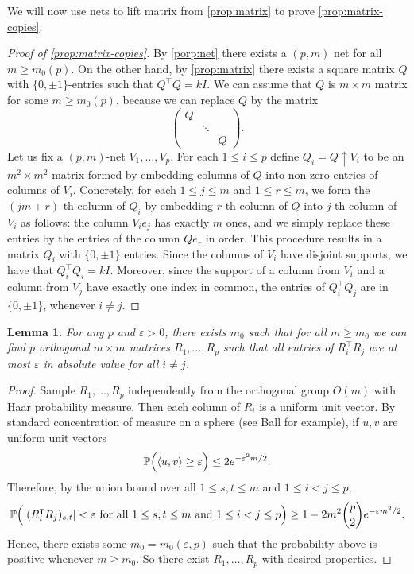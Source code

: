 \documentclass[reqno, 11pt]{amsart}
\newtheorem{lemma}[theorem]{Lemma}
\theoremstyle{definition}
\theoremstyle{remark}
\newcommand{\ang}[1]{\left\langle #1 \right\rangle}
\newcommand{\PP}{\mathbb{P}}
\begin{document}
We will now use nets to lift matrix from \cref{prop:matrix} to prove \cref{prop:matrix-copies}.

\begin{proof}[Proof of \cref{prop:matrix-copies}]
    By \cref{porp:net} there exists a $(p,m)$ net for all $m \geq m_0(p)$. On the other hand, by \cref{prop:matrix} there exists a square matrix $Q$ with $\{0, \pm 1\}$-entries such that $Q^\intercal Q = kI$. We can assume that $Q$ is $m \times m$ matrix for some $m \geq m_0(p)$, because we can replace $Q$ by the matrix
   \[
				\begin{pmatrix}
					Q &  &   \\
					 & \ddots & \\
					& & Q
					\end{pmatrix}.
    \]
    Let us fix a $(p,m)$-net $V_1, \ldots, V_p$. For each $1 \leq i \leq p$ define $Q_i = Q \uparrow V_i$ to be an $m^2 \times m^2$ matrix formed by embedding columns of $Q$ into non-zero entries of columns of $V_i$.  Concretely, for each $1 \leq j \leq m$ and $1 \leq r \leq m$, we form the $(jm + r)$-th column of $Q_i$ by embedding $r$-th column of $Q$ into $j$-th column of $V_i$ as follows: the column $V_ie_j$ has exactly $m$ ones, and we simply replace these entries by the entries of the column $Qe_r$ in order. This procedure results in a matrix $Q_i$ with $\{0, \pm 1\}$ entries. Since the columns of $V_i$ have disjoint supports, we have that $Q_i^\intercal Q_i = kI$. Moreover, since the support of a column from $V_i$ and a column from $V_j$ have exactly one index in common, the entries of $Q_i^\intercal Q_j$ are in $\{0, \pm 1\}$, whenever $i \neq j$. 
 \end{proof}

\begin{lemma}\label{lem:matrix-copies}
    For any $p$ and $\varepsilon > 0$, there exists $m_0$ such that for all $m \geq m_0$ we can find $p$ orthogonal $m\times m$ matrices $R_1, \ldots, R_p$ such that  all entries of $R_i^\intercal R_j$ are at most $\varepsilon$ in absolute value for all $i \neq j$.
\end{lemma}
\begin{proof}
    Sample $R_1, \ldots, R_p$ independently from the orthogonal group $O(m)$ with Haar probability measure. Then each column of $R_i$ is a uniform unit vector. By standard concentration of measure on a sphere (see Ball \cite{Bal97} for example), if $u, v$ are uniform unit vectors
    \[
        \PP \Bigl( \ang{u,v} \geq \varepsilon \Bigr) \leq 2 e^{-\varepsilon^2 m/2}.
    \]
    Therefore, by the union bound over all $1\leq s, t \leq m$ and $1 \leq i < j \leq p$,
    \[
        \PP \Bigl( |(R_i^\intercal R_j)_{s,t}| < \varepsilon \text{ for all $1\leq s, t \leq m$ and $1 \leq i < j \leq p$} \Bigr) \geq 1 - 2m^2\binom{p}{2}e^{-\varepsilon m^2/2}.
    \]
    Hence, there exists some $m_0 = m_0(\varepsilon, p)$ such that the probability above is positive whenever $m \geq m_0$. So there exist $R_1, \ldots, R_p$ with desired properties.    
\end{proof}
\end{document}
